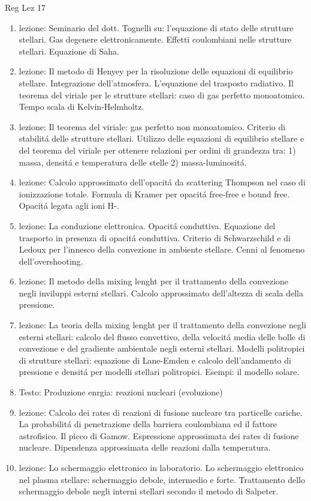 \begin{frame}[allowframebreaks]{Reg Lez 17}
\begin{enumerate}
\item lezione: Seminario del dott. Tognelli su: l'equazione di stato delle strutture stellari. Gas degenere elettronicamente. Effetti coulombiani nelle strutture stellari. Equazione di Saha.
\item lezione: Il metodo di Henyey per la risoluzione delle equazioni di equilibrio stellare. Integrazione dell'atmosfera. L'equazione del trasposto radiativo. Il teorema del viriale per le strutture stellari: caso di gas perfetto monoatomico. Tempo scala di Kelvin-Helmholtz.
\item lezione: Il teorema del viriale: gas perfetto non monoatomico. Criterio di stabilit\'a delle strutture stellari. Utilizzo delle equazioni di equilibrio stellare e del teorema del viriale per ottenere relazioni per ordini di grandezza tra: 1) massa, densit\'a e temperatura delle stelle 2) massa-luminosit\'a.
\item lezione: Calcolo approssimato dell'opacit\'a da scattering Thompson nel caso di ionizzazione totale. Formula di Kramer per opacit\'a free-free e bound free. Opacit\'a legata agli ioni H-.
\item lezione: La conduzione elettronica. Opacit\'a conduttiva. Equazione del trasporto in presenza di opacit\'a conduttiva. Criterio di Schwarzschild e di Ledoux per l'innesco della convezione in ambiente stellare. Cenni al fenomeno dell'overshooting.
\item lezione: Il metodo della mixing lenght per il trattamento della convezione negli inviluppi esterni stellari. Calcolo approssimato dell'altezza di scala della pressione. 
\item lezione: La teoria della mixing lenght per il trattamento della convezione negli esterni stellari: calcolo del flusso convettivo, della velocit\'a media delle bolle di convezione e del gradiente ambientale negli esterni stellari. Modelli politropici di strutture stellari: equazione di Lane-Emden e calcolo dell'andamento di pressione e densit\'a per modelli stellari politropici. Esempi: il modello solare.
\item Testo: Produzione enrgia: reazioni nucleari (evoluzione)
\item lezione: Calcolo dei rates di reazioni di fusione nucleare tra particelle cariche. La probabilit\'a di penetrazione della barriera coulombiana ed il fattore astrofisico. Il picco di Gamow. Espressione approssimata dei rates di fusione nucleare. Dipendenza approssimata delle reazioni dalla temperatura.
\item lezione: Lo schermaggio elettronico in laboratorio. Lo schermaggio elettronico nel plasma stellare: schermaggio debole, intermedio e forte. Trattamento dello schermaggio debole negli interni stellari secondo il metodo di Salpeter. 

\end{enumerate}
\end{frame}
